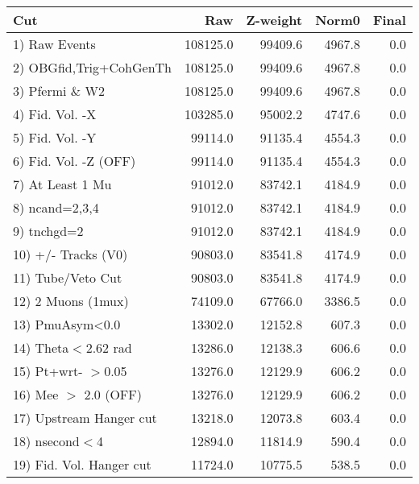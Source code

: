  \begin{table}[h!]\centering
 \begin{tabular}{||l||r|r|r|r||}
 \hline
 \hline
 Cut & Raw & Z-weight & Norm0 & Final \\
 \hline
  1) Raw Events           &    108125.0 &     99409.6 &      4967.8 &         0.0 \\
  2) OBGfid,Trig+CohGenTh &    108125.0 &     99409.6 &      4967.8 &         0.0 \\
  3) Pfermi \& W2         &    108125.0 &     99409.6 &      4967.8 &         0.0 \\
  4) Fid. Vol. -X         &    103285.0 &     95002.2 &      4747.6 &         0.0 \\
  5) Fid. Vol. -Y         &     99114.0 &     91135.4 &      4554.3 &         0.0 \\
  6) Fid. Vol. -Z (OFF)   &     99114.0 &     91135.4 &      4554.3 &         0.0 \\
  7) At Least 1 Mu        &     91012.0 &     83742.1 &      4184.9 &         0.0 \\
  8) ncand=2,3,4          &     91012.0 &     83742.1 &      4184.9 &         0.0 \\
  9) tnchgd=2             &     91012.0 &     83742.1 &      4184.9 &         0.0 \\
 10) +/- Tracks (V0)      &     90803.0 &     83541.8 &      4174.9 &         0.0 \\
 11) Tube/Veto Cut        &     90803.0 &     83541.8 &      4174.9 &         0.0 \\
 12) 2 Muons (1mux)       &     74109.0 &     67766.0 &      3386.5 &         0.0 \\
 13) PmuAsym<0.0          &     13302.0 &     12152.8 &       607.3 &         0.0 \\
 14) Theta$<$2.62 rad     &     13286.0 &     12138.3 &       606.6 &         0.0 \\
 15) Pt+wrt- $>$0.05      &     13276.0 &     12129.9 &       606.2 &         0.0 \\
 16) Mee $>$ 2.0  (OFF)   &     13276.0 &     12129.9 &       606.2 &         0.0 \\
 17) Upstream Hanger cut  &     13218.0 &     12073.8 &       603.4 &         0.0 \\
 18) nsecond$<$4          &     12894.0 &     11814.9 &       590.4 &         0.0 \\
 19) Fid. Vol. Hanger cut &     11724.0 &     10775.5 &       538.5 &         0.0 \\

\end{tabular}
\end{table}
